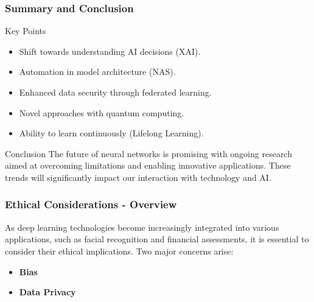 \documentclass[aspectratio=169]{beamer}
\begin{document}
\begin{frame}[fragile]
    \frametitle{Summary and Conclusion}
    \begin{block}{Key Points}
        \begin{itemize}
            \item Shift towards understanding AI decisions (XAI).
            \item Automation in model architecture (NAS).
            \item Enhanced data security through federated learning.
            \item Novel approaches with quantum computing.
            \item Ability to learn continuously (Lifelong Learning).
        \end{itemize}
    \end{block}
    \begin{block}{Conclusion}
        The future of neural networks is promising with ongoing research aimed at overcoming limitations and enabling innovative applications. These trends will significantly impact our interaction with technology and AI.
    \end{block}
\end{frame}

\begin{frame}[fragile]
  \frametitle{Ethical Considerations - Overview}
  As deep learning technologies become increasingly integrated into various applications, such as facial recognition and financial assessments, it is essential to consider their ethical implications. Two major concerns arise: 
  \begin{itemize}
      \item \textbf{Bias}
      \item \textbf{Data Privacy}
  \end{itemize}
\end{frame}
\end{document}
